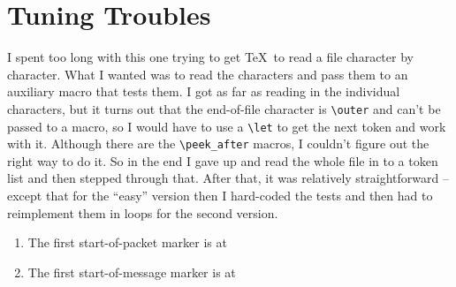 \documentclass{article}
\begin{document}
\section{Tuning Troubles}

I spent too long with this one trying to get \TeX\ to read a file character by character.
What I wanted was to read the characters and pass them to an auxiliary macro that tests them.
I got as far as reading in the individual characters, but it turns out that the end-of-file character is \Verb!\outer! and can't be passed to a macro, so I would have to use a \Verb!\let! to get the next token and work with it.
Although there are the \Verb!\peek_after! macros, I couldn't figure out the right way to do it.
So in the end I gave up and read the whole file in to a token list and then stepped through that.
After that, it was relatively straightforward -- except that for the ``easy'' version then I hard-coded the tests and then had to reimplement them in loops for the second version.


\begin{enumerate}
\item The first start-of-packet marker is at 
\item The first start-of-message marker is at 
\end{enumerate}
\end{document}

